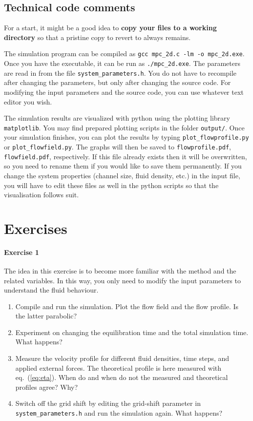 \documentclass[sizes,12pt,nftimes]{article}
\begin{document}
\subsection*{Technical code comments }

For a start, it might be a good idea to {\bf copy your files to a
  working directory} so that a pristine copy to revert to always
remains.
 
The simulation program can be compiled as \mbox{\texttt{gcc
    mpc\_2d.c -lm -o mpc\_2d.exe}}. Once you have the executable, it
can be run as \mbox{\texttt{./mpc\_2d.exe}}. The parameters are read
in from the file \mbox{\texttt{system\_parameters.h}}. You do not have
to recompile after changing the parameters, but only after changing
the source code. For modifying the input parameters and the source
code, you can use whatever text editor you wish. 
  
The simulation results are visualized with python using the plotting
library \mbox{\texttt{matplotlib}}. You may find prepared plotting scripts in the
folder \mbox{\texttt{output/}}. Once your simulation finishes, you can
plot the results by typing \mbox{\texttt{plot\_flowprofile.py}} or
\mbox{\texttt{plot\_flowfield.py}}. The graphs will then be saved to
\mbox{\texttt{flowprofile.pdf}}, \mbox{\texttt{flowfield.pdf}},
respectively. If this file already exists then it will be overwritten,
so you need to rename them if you would like to save them
permanently. If you change the system properties (channel size, fluid
density, etc.) in the input file, you will have to edit these files as
well in the python scripts so that the visualisation follows suit.
  
\newpage
\section*{Exercises}
 
\paragraph*{Exercise 1} The idea in this exercise is to become more familiar
with the method and the related variables. In this way, you only need
to modify the input parameters to understand the fluid behaviour.

\begin{enumerate}
\item Compile and run the simulation. Plot the flow field and the flow
  profile. Is the latter parabolic?
\item Experiment on changing the equilibration time and the total
  simulation time. What happens?
\item Measure the velocity profile for different fluid densities, time
  steps, and applied external forces. The theoretical profile is here
  measured with eq.~(\ref{eq:eta}). When do and when do not the
  measured and theoretical profiles agree? Why?
\item Switch off the grid shift by editing the grid-shift parameter in
  \mbox{\texttt{system\_parameters.h}} and run the simulation
  again. What happens?
\end{enumerate}
\end{document}

